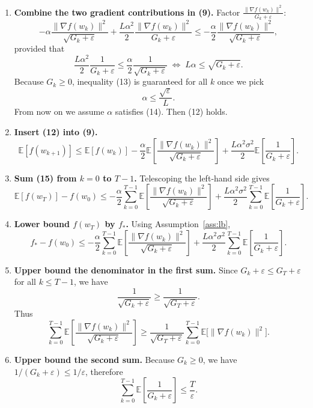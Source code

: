 \documentclass{article}
\newcommand{\E}{\mathbb{E}}
\begin{document}
\begin{enumerate}[label=[Step \arabic*],leftmargin=*]
\item \textbf{Combine the two gradient contributions in (9).}  
Factor $\frac{\|\nabla f(w_k)\|^{2}}{G_{k}+\varepsilon}$:
\[
-\alpha\frac{\|\nabla f(w_k)\|^{2}}{\sqrt{G_{k}+\varepsilon}}
+\frac{L\alpha^{2}}{2}\frac{\|\nabla f(w_k)\|^{2}}{G_{k}+\varepsilon}
\le
-\frac{\alpha}{2}\frac{\|\nabla f(w_k)\|^{2}}{\sqrt{G_{k}+\varepsilon}},
\tag{12}
\]
provided that
\[
\frac{L\alpha^{2}}{2}\frac{1}{G_{k}+\varepsilon}
\le \frac{\alpha}{2}\frac{1}{\sqrt{G_{k}+\varepsilon}}
\;\Longleftrightarrow\;
L\alpha \le \sqrt{G_{k}+\varepsilon}.
\tag{13}
\]
Because $G_{k}\ge0$, inequality (13) is guaranteed for all $k$ once we pick
\[
\alpha \le \frac{\sqrt{\varepsilon}}{L}.
\tag{14}
\]
From now on we assume $\alpha$ satisfies (14). Then (12) holds.

\item \textbf{Insert (12) into (9).}  
\[
\E[f(w_{k+1})]
\le \E[f(w_k)]
-\frac{\alpha}{2}\E\!\left[\frac{\|\nabla f(w_k)\|^{2}}{\sqrt{G_{k}+\varepsilon}}\right]
+\frac{L\alpha^{2}\sigma^{2}}{2}\E\!\left[\frac{1}{G_{k}+\varepsilon}\right].
\tag{15}
\]

\item \textbf{Sum (15) from $k=0$ to $T-1$.}  
Telescoping the left‑hand side gives
\[
\E[f(w_T)]-f(w_0)
\le
-\frac{\alpha}{2}\sum_{k=0}^{T-1}\E\!\left[\frac{\|\nabla f(w_k)\|^{2}}{\sqrt{G_{k}+\varepsilon}}\right]
+\frac{L\alpha^{2}\sigma^{2}}{2}\sum_{k=0}^{T-1}\E\!\left[\frac{1}{G_{k}+\varepsilon}\right].
\tag{16}
\]

\item \textbf{Lower bound $f(w_T)$ by $f_*$.}  
Using Assumption~\ref{ass:lb},
\[
f_* - f(w_0)
\le
-\frac{\alpha}{2}\sum_{k=0}^{T-1}\E\!\left[\frac{\|\nabla f(w_k)\|^{2}}{\sqrt{G_{k}+\varepsilon}}\right]
+\frac{L\alpha^{2}\sigma^{2}}{2}\sum_{k=0}^{T-1}\E\!\left[\frac{1}{G_{k}+\varepsilon}\right].
\tag{17}
\]

\item \textbf{Upper bound the denominator in the first sum.}  
Since $G_{k}+\varepsilon\le G_T+\varepsilon$ for all $k\le T-1$, we have
\[
\frac{1}{\sqrt{G_{k}+\varepsilon}}
\ge \frac{1}{\sqrt{G_T+\varepsilon}}.
\tag{18}
\]
Thus
\[
\sum_{k=0}^{T-1}\E\!\left[\frac{\|\nabla f(w_k)\|^{2}}{\sqrt{G_{k}+\varepsilon}}\right]
\ge
\frac{1}{\sqrt{G_T+\varepsilon}}\sum_{k=0}^{T-1}\E\bigl[\|\nabla f(w_k)\|^{2}\bigr].
\tag{19}
\]

\item \textbf{Upper bound the second sum.}  
Because $G_{k}\ge0$, we have $1/(G_{k}+\varepsilon)\le 1/\varepsilon$, therefore
\[
\sum_{k=0}^{T-1}\E\!\left[\frac{1}{G_{k}+\varepsilon}\right]
\le \frac{T}{\varepsilon}.
\tag{20}
\]


\end{enumerate}
\end{document}
